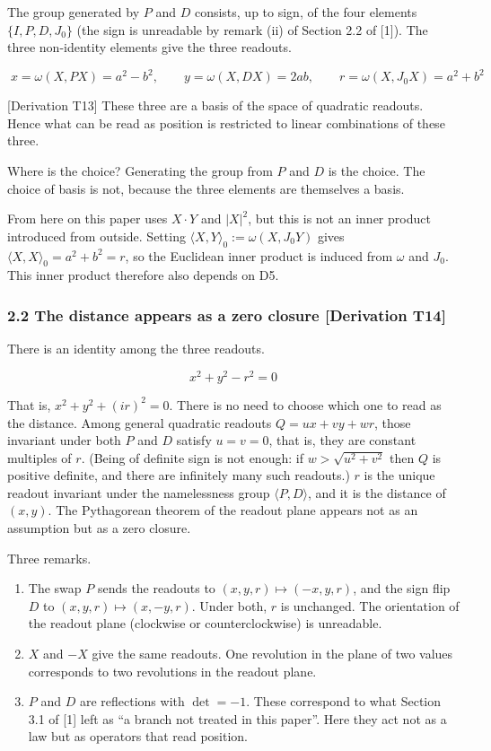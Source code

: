 \documentclass[
  a4paper,
]{article}
\begin{document}
The group generated by \(P\) and \(D\) consists, up to sign, of the four
elements \(\{I,P,D,J_0\}\) (the sign is unreadable by remark (ii) of
Section 2.2 of {[}1{]}). The three non-identity elements give the three
readouts.

\[
\boxed{\;x=\omega(X,PX)=a^2-b^2,\qquad y=\omega(X,DX)=2ab,\qquad r=\omega(X,J_0X)=a^2+b^2\;}
\]

{[}Derivation T13{]} These three are a basis of the space of quadratic
readouts. Hence what can be read as position is restricted to linear
combinations of these three.

Where is the choice? Generating the group from \(P\) and \(D\) is the
choice. The choice of basis is not, because the three elements are
themselves a basis.

From here on this paper uses \(X\cdot Y\) and \(\lvert X\rvert^2\), but
this is not an inner product introduced from outside. Setting
\(\langle X,Y\rangle_0:=\omega(X,J_0Y)\) gives
\(\langle X,X\rangle_0=a^2+b^2=r\), so the Euclidean inner product is
induced from \(\omega\) and \(J_0\). This inner product therefore also
depends on D5.

\subsubsection{2.2 The distance appears as a zero closure {[}Derivation
T14{]}}\label{the-distance-appears-as-a-zero-closure-derivation-t14}

There is an identity among the three readouts.

\[
\boxed{\;x^2+y^2-r^2=0\;}
\]

That is, \(x^2+y^2+(ir)^2=0\). There is no need to choose which one to
read as the distance. Among general quadratic readouts \(Q=ux+vy+wr\),
those invariant under both \(P\) and \(D\) satisfy \(u=v=0\), that is,
they are constant multiples of \(r\). (Being of definite sign is not
enough: if \(w>\sqrt{u^2+v^2}\) then \(Q\) is positive definite, and
there are infinitely many such readouts.) \(r\) is the unique readout
invariant under the namelessness group \(\langle P,D\rangle\), and it is
the distance of \((x,y)\). The Pythagorean theorem of the readout plane
appears not as an assumption but as a zero closure.

Three remarks.

\begin{enumerate}
\def\labelenumi{(\roman{enumi})}
\item
  The swap \(P\) sends the readouts to \((x,y,r)\mapsto(-x,y,r)\), and
  the sign flip \(D\) to \((x,y,r)\mapsto(x,-y,r)\). Under both, \(r\)
  is unchanged. The orientation of the readout plane (clockwise or
  counterclockwise) is unreadable.
\item
  \(X\) and \(-X\) give the same readouts. One revolution in the plane
  of two values corresponds to two revolutions in the readout plane.
\item
  \(P\) and \(D\) are reflections with \(\det=-1\). These correspond to
  what Section 3.1 of {[}1{]} left as ``a branch not treated in this
  paper''. Here they act not as a law but as operators that read
  position.
\end{enumerate}
\end{document}
